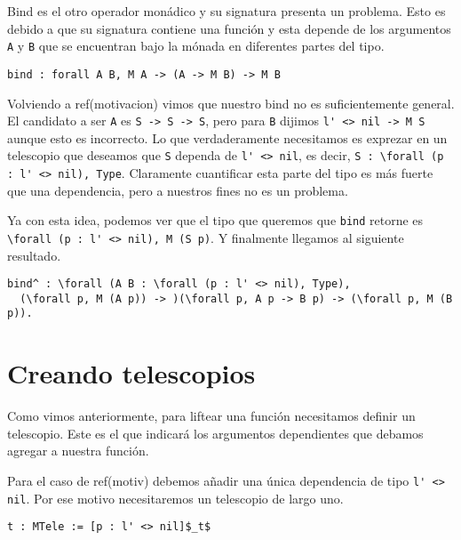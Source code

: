 Bind es el otro operador monádico y su signatura presenta un problema. Esto es debido a que su signatura contiene una función y esta depende de los argumentos \lstinline{A} y \lstinline{B} que se encuentran bajo la mónada en diferentes partes del tipo.

\begin{lstlisting}[float=h,frame=tb,caption={Signatura de bind},label=lst:bind]
bind : forall A B, M A -> (A -> M B) -> M B
\end{lstlisting}

Volviendo a ref(motivacion) vimos que nuestro bind no es suficientemente general. El candidato a ser \lstinline{A} es \lstinline{S -> S -> S}, pero para \lstinline{B} dijimos \lstinline{l' <> nil -> M S} aunque esto es incorrecto. Lo que verdaderamente necesitamos es exprezar en un telescopio que deseamos que \texttt{S} dependa de \lstinline{l' <> nil}, es decir, \lstinline{S : \forall (p : l' <> nil), Type}. Claramente cuantificar esta parte del tipo es más fuerte que una dependencia, pero a nuestros fines no es un problema.

Ya con esta idea, podemos ver que el tipo que queremos que \lstinline{bind} retorne es \lstinline{\forall (p : l' <> nil), M (S p)}. Y finalmente llegamos al siguiente resultado.

\begin{lstlisting}[float=h,frame=tb,caption={Nueva signatura de bind},label=lst:bind_motiv]
bind^ : \forall (A B : \forall (p : l' <> nil), Type),
  (\forall p, M (A p)) -> )(\forall p, A p -> B p) -> (\forall p, M (B p)).
\end{lstlisting}

\section{Creando telescopios}

Como vimos anteriormente, para liftear una función necesitamos definir un telescopio. Este es el que indicará los argumentos dependientes que debamos agregar a nuestra función.

Para el caso de ref(motiv) debemos añadir una única dependencia de tipo \lstinline{l' <> nil}. Por ese motivo necesitaremos un telescopio de largo uno.

\begin{lstlisting}[float=h,frame=tb,caption={Nueva signatura de bind},label=lst:list_max_tele]
t : MTele := [p : l' <> nil]$_t$
\end{lstlisting}

